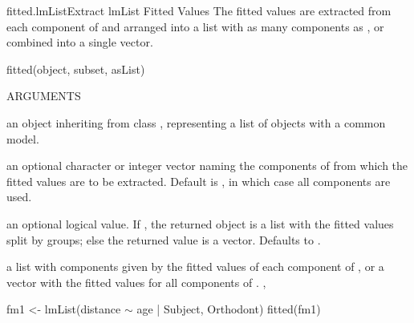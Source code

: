 \documentclass[pdftex]{article} \usepackage{url,graphicx}
\renewcommand{\Twiddle}{\mbox{\(\sim\)}}
\begin{document}
\begin{Helpfile}{fitted.lmList}{Extract lmList Fitted Values}
The fitted values are extracted from each  component of
 and arranged into a list with as many components as
, or combined into a single vector.
\begin{Example}
fitted(object, subset, asList)
\end{Example}
\begin{Argument}{ARGUMENTS}
\item[\Co{object:}]
an object inheriting from class , representing
a list of  objects with a common model.
\item[\Co{subset:}]
an optional character or integer vector naming the
 components of  from which the fitted values
are to be extracted. Default is , in which case all
components are used.
\item[\Co{asList:}]
an optional logical value. If , the returned
object is a list with the fitted values split by groups; else the
returned value is a vector. Defaults to .
\end{Argument}
a list with components given by the fitted values of each 
component of , or a vector with the fitted values for all
 components of .
, 
\need 15pt
\vspace{-16pt}
\begin{Example}
fm1 <- lmList(distance {\Twiddle} age | Subject, Orthodont)
fitted(fm1)
\end{Example}
\end{Helpfile}
\end{document}
